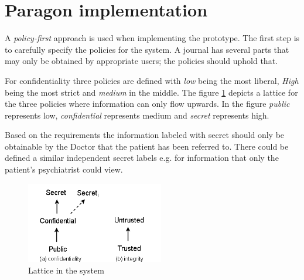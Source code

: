 





\section{Paragon implementation}

A \emph{policy-first} approach is used when implementing the prototype. The first step is to carefully specify the policies for the system. A journal has several parts that may only be obtained by appropriate users; the policies should uphold that.

For confidentiality three policies are defined with \emph{low} being the most liberal, \emph{High} being the most strict and \emph{medium} in the middle. The figure \ref{fig:lattice_confidentiality} depicts a lattice for the three policies where information can only flow upwards. In the figure \emph{public} represents low, \emph{confidential} represents medium and \emph{secret} represents high. 

Based on the requirements the information labeled with secret should only be obtainable by the Doctor that the patient has been referred to. There could be defined a similar independent secret labels e.g. for information that only the patient's psychiatrist could view.  


\begin{figure}[H] 
	\centering
	\includegraphics[width=6cm]{figures/lattice_confidentiality.png}
	\caption{Lattice in the system}
	\label{fig:lattice_confidentiality}
\end{figure}

